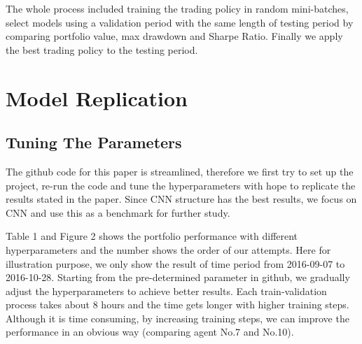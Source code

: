 \documentclass[11pt]{paper}
\begin{document}
		The whole process included training the trading policy in random mini-batches, select models using a validation period with the same length of testing period by comparing portfolio value, max drawdown and Sharpe Ratio. Finally we apply the best trading policy to the testing period. 


	

	


	\section{Model Replication}
		\subsection{Tuning The Parameters}
		The github code for this paper is streamlined, therefore we first try to set up the project, re-run the code and tune the hyperparameters with hope to replicate the results stated in the paper. Since CNN structure has the best results, we focus on CNN and use this as a benchmark for further study.

		Table 1 and Figure 2 shows the portfolio performance with different hyperparameters and the number shows the order of our attempts. Here for illustration purpose, we only show the result of time period from 2016-09-07 to 2016-10-28. Starting from the pre-determined parameter in github, we gradually adjust the hyperparameters to achieve better results. Each train-validation process takes about 8 hours and the time gets longer with higher training steps. Although it is time consuming, by increasing training steps, we can improve the performance in an obvious way (comparing agent No.7 and No.10). 
\end{document}
